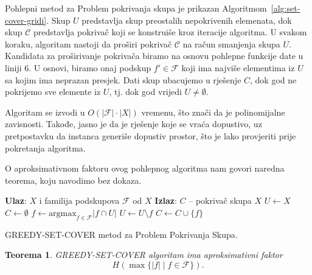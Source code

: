 \documentclass[a4paper, utf8, 11pt, colorlinks]{book}
\newtheorem{thm}{Teorema}[chapter]
\theoremstyle{definition}
\begin{document}
 Pohlepni metod za Problem pokrivanja skupa je prikazan Algoritmom~\ref{alg:set-cover-gridi}.  %
Skup $U$ predstavlja skup preostalih nepokrivenih elemenata, dok skup $\mathcal{C}$ predstavlja pokrivač koji se konstruiše kroz iteracije algoritma. U svakom koraku, algoritam nastoji da proširi pokrivač $\mathcal{C}$ na račun smanjenja skupa $U$. Kandidata za proširivanje pokrivača biramo na osnovu pohlepne funkcije date u liniji 6. U osnovi, biramo onaj  podskup $f' \in \mathcal{F}$ koji ima najviše  elementima iz $U$ sa kojim ima neprazan presjek. Dati skup ubacujemo u rješenje $C$, dok god ne pokrijemo sve elemente iz $U$, tj. dok god vrijedi $U \neq \emptyset$.

Algoritam se izvodi u $O(|\mathcal{F}| \cdot |X|)$ vremenu, što znači da je polinomijalne zavisnosti. Takođe, jasno je da je rješenje koje se vraća dopustivo, uz pretpostavku da instanca generiše dopustiv prostor, što je lako provjeriti prije pokretanja algoritma. 

O aproksimativnom faktoru ovog pohlepnog algoritma nam govori naredna teorema, koju navodimo bez dokaza. %


\begin{algorithm}[!t] 
	\begin{algorithmic}[1]
		\STATE \textbf{Ulaz}: $X$ i familija podskupova $\mathcal{F}$ od $X$
		\STATE \textbf{Izlaz}: $C$ -- pokrivač skupa $X$
		\STATE $U \gets X$
		\STATE $C \gets \emptyset$
		\STATE $f \gets \mbox{argmax}_{f \in \mathcal{F} } |f \cap U | $
		\STATE $U \gets U \setminus f$
		\STATE $C \gets C \cup \{f\}$
		\ENDWHILE
	\end{algorithmic}
	\caption{GREEDY-SET-COVER metod za Problem Pokrivanja Skupa.}
    \label{alg:set-cover-gridi}
\end{algorithm}

\begin{thm}
	  \mbox{GREEDY-SET-COVER} algoritam ima aproksimativni faktor 
	$$ H(\max\{|f| \mid f \in \mathcal{F}\}).$$
	
\end{thm}
\end{document}
